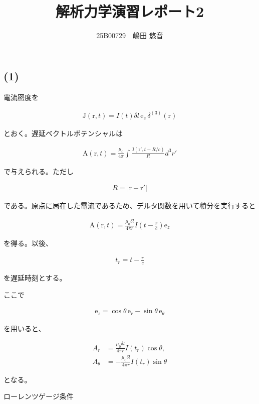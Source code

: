 \documentclass[platex,dvipdfmx,a4paper]{jsarticle}
\title{解析力学演習レポート2}
\author{25B00729　嶋田 悠音}
\newcommand{\vect}[1]{\boldsymbol{\mathrm{#1}}}
\begin{document}
\maketitle
\subsection*{(1)}

電流密度を

\begin{align*}
  \vect{J}(\vect{r},t)
  =
  I(t)\delta l\,\vect{e}_z\,\delta^{(3)}(\vect{r})
\end{align*}

とおく。遅延ベクトルポテンシャルは

\begin{align*}
  \vect{A}(\vect{r},t)
  =
  \frac{\mu_0}{4\pi}
  \int
  \frac{\vect{J}(\vect{r}',t-R/c)}{R}
  d^3r'
\end{align*}

で与えられる。ただし

\begin{align*}
  R=|\vect{r}-\vect{r}'|
\end{align*}

である。原点に局在した電流であるため、デルタ関数を用いて積分を実行すると

\begin{align*}
  \vect{A}(\vect{r},t)
  =
  \frac{\mu_0\delta l}{4\pi r}
  I\!\left(t-\frac{r}{c}\right)
  \vect{e}_z
\end{align*}

を得る。以後、

\begin{align*}
  t_r=t-\frac{r}{c}
\end{align*}

を遅延時刻とする。

ここで

\begin{align*}
  \vect{e}_z
  =
  \cos\theta\,\vect{e}_r
  -
  \sin\theta\,\vect{e}_\theta
\end{align*}

を用いると、

\begin{align*}
  A_r
  &=
  \frac{\mu_0\delta l}{4\pi r}
  I(t_r)\cos\theta,\\
  A_\theta
  &=
  -\frac{\mu_0\delta l}{4\pi r}
  I(t_r)\sin\theta
\end{align*}

となる。

ローレンツゲージ条件
\end{document}
